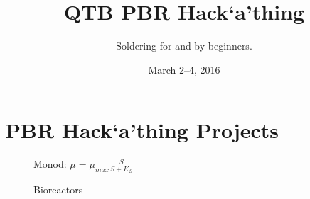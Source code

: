 \documentclass[12pt,a4paper]{scrartcl}
\title{QTB PBR Hack`a'thing}
\subtitle{Soldering for and by beginners.}
\date{March 2--4, 2016}
\begin{document}
\maketitle
\tableofcontents
\newpage

\section{PBR Hack`a'thing Projects}
\label{proj}

\begin{figure}[ht]
  \begin{minipage}{.49\textwidth}
  \end{minipage}
  \begin{minipage}{.49\textwidth}
    \centering Monod: $\mu = \mu_{max} \frac{S}{S+K_S}$\\
  \end{minipage}
\caption[]{Bioreactors}
\end{figure}
\end{document}
